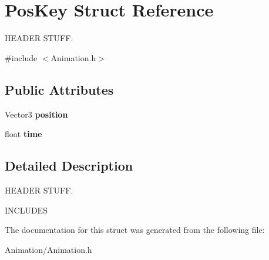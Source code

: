 \hypertarget{structPosKey}{}\section{Pos\+Key Struct Reference}
\label{structPosKey}


H\+E\+A\+D\+ER S\+T\+U\+FF.  




{\ttfamily \#include $<$Animation.\+h$>$}

\subsection*{Public Attributes}
\begin{DoxyCompactItemize}
\item 
\mbox{\label{structPosKey_ab4d6a9df96d150ef750e23f086aacecb}} 
Vector3 {\bfseries position}
\item 
\mbox{\label{structPosKey_a9ff7590acc0c4dba992a3a33b3651173}} 
float {\bfseries time}
\end{DoxyCompactItemize}


\subsection{Detailed Description}
H\+E\+A\+D\+ER S\+T\+U\+FF. 

I\+N\+C\+L\+U\+D\+ES 

The documentation for this struct was generated from the following file\+:\begin{DoxyCompactItemize}
\item 
Animation/Animation.\+h\end{DoxyCompactItemize}
